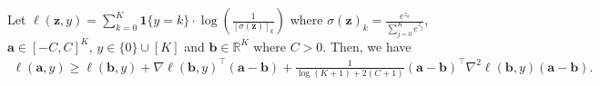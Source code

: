 \begin{myLemma}
    \label{lem:strongly-convex}
    Let $\ell(\mathbf{z}, y)=\sum_{k=0}^K \mathbf{1}\{y=k\} \cdot \log \left(\frac{1}{[\sigma(\mathbf{z})]_k}\right)$ where $\sigma(\mathbf{z})_k=\frac{e^{z_k}}{\sum_{j=0}^K e^{z_{j}}}$, $\mathbf{a} \in[-C, C]^K$, $y \in\{0\} \cup[K]$ and $\mathbf{b} \in \mathbb{R}^K$ where $C>0$. Then, we have
    \begin{align*}
        \ell(\mathbf{a}, y) \geq \ell(\mathbf{b}, y)+\nabla \ell(\mathbf{b}, y)^{\top}(\mathbf{a}-\mathbf{b})+\frac{1}{\log (K+1)+2(C+1)}(\mathbf{a}-\mathbf{b})^{\top} \nabla^2 \ell(\mathbf{b}, y)(\mathbf{a}-\mathbf{b}) .
    \end{align*}
\end{myLemma}
